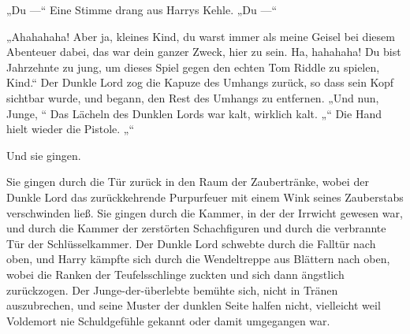 „Du —“ Eine Stimme drang aus Harrys Kehle.
„Du —“

„Ahahahaha! Aber ja, kleines Kind, du warst immer als meine Geisel bei diesem Abenteuer dabei, das war dein ganzer Zweck, hier zu sein. Ha, hahahaha! Du bist Jahrzehnte zu jung, um dieses Spiel gegen den echten Tom Riddle zu spielen, Kind.“
Der Dunkle Lord zog die Kapuze des Umhangs zurück, so dass sein Kopf sichtbar wurde, und begann, den Rest des Umhangs zu entfernen.
„Und nun, Junge, “
Das Lächeln des Dunklen Lords war kalt, wirklich kalt.
„“
Die Hand hielt wieder die Pistole.
„“

Und sie gingen.

Sie gingen durch die Tür zurück in den Raum der Zaubertränke, wobei der Dunkle Lord das zurückkehrende Purpurfeuer mit einem Wink seines Zauberstabs verschwinden ließ. Sie gingen durch die Kammer, in der der Irrwicht gewesen war, und durch die Kammer der zerstörten Schachfiguren und durch die verbrannte Tür der Schlüsselkammer. Der Dunkle Lord schwebte durch die Falltür nach oben, und Harry kämpfte sich durch die Wendeltreppe aus Blättern nach oben, wobei die Ranken der Teufelsschlinge zuckten und sich dann ängstlich zurückzogen. Der Junge-der-überlebte bemühte sich, nicht in Tränen auszubrechen, und seine Muster der dunklen Seite halfen nicht, vielleicht weil Voldemort nie Schuldgefühle gekannt oder damit umgegangen war.


